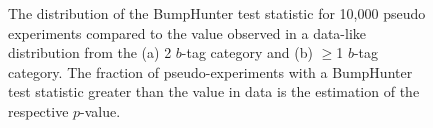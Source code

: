 \begin{figure}[!ht]
  \begin{center}
    \captionsetup[subfigure]{aboveskip=0pt,justification=centering}
  \end{center}
  \caption{The distribution of the BumpHunter test statistic for 10,000 pseudo experiments compared
    to the value observed in a data-like distribution from the (a) 2 $b$-tag category and (b) $\geq$1 $b$-tag category.
    The fraction of pseudo-experiments with a BumpHunter test statistic greater than the value in data is the estimation of the respective \mbox{$p$-value}.}
  \label{fig:DataLikeStatPlots_bh}
\end{figure}


